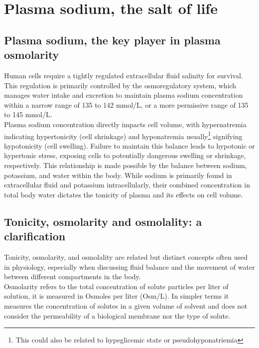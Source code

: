 \chapter{Plasma sodium, the salt of life}

\section{Plasma sodium, the key player in plasma osmolarity}

Human cells require a tightly regulated extracellular fluid salinity for survival. This regulation is primarily controlled by the osmoregulatory system, which manages water intake and excretion to maintain plasma sodium concentration within a narrow range of 135 to 142 mmol/L, or a more permissive range of 135 to 145 mmol/L.\\

Plasma sodium concentration directly impacts cell volume, with hypernatremia indicating hypertonicity (cell shrinkage) and hyponatremia usually\footnote {This could also be related to hypeglicemic state or pseudohyponatriemia} signifying hypotonicity (cell swelling). Failure to maintain this balance leads to hypotonic or hypertonic stress, exposing cells to potentially dangerous swelling or shrinkage, respectively. This relationship is made possible by the balance between sodium, potassium, and water within the body. While sodium is primarily found in extracellular fluid and potassium intracellularly, their combined concentration in total body water dictates the tonicity of plasma and its effects on cell volume.\\

\section{Tonicity, osmolarity and osmolality: a clarification}
Tonicity, osmolarity, and osmolality are related but distinct concepts often used in physiology, especially when discussing fluid balance and the movement of water between different compartments in the body.\\

Osmolarity refers to the total concentration of solute particles per liter of solution, it is measured in Osmoles per liter (Osm/L). 
\newline In simpler terms it measures the concentration of solutes in a given volume of solvent and does not consider the permeability of a biological membrane nor the type of solute.\\

